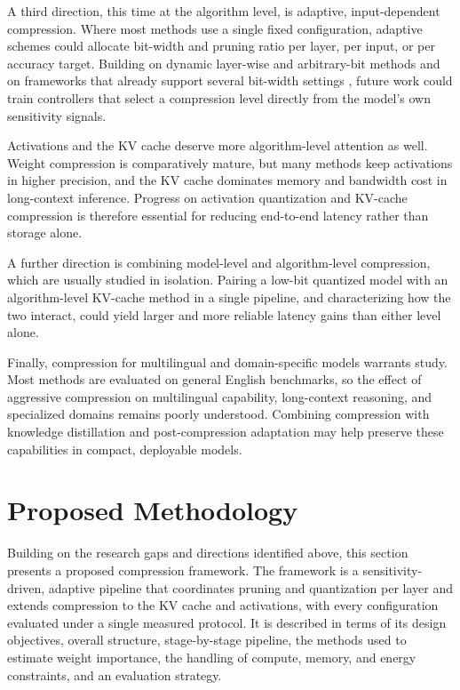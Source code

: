 \documentclass[
11pt, %
english, %
singlespacing, %
headsepline, %
]{MastersDoctoralThesis} %
\begin{document}
A third direction, this time at the algorithm level, is adaptive, input-dependent compression. Where most methods use a single fixed configuration, adaptive schemes could allocate bit-width and pruning ratio per layer, per input, or per accuracy target. Building on dynamic layer-wise and arbitrary-bit methods \cite{xu2026daypq,zeng2025abqllm} and on frameworks that already support several bit-width settings \cite{shao2024omniquant}, future work could train controllers that select a compression level directly from the model's own sensitivity signals.

Activations and the KV cache deserve more algorithm-level attention as well. Weight compression is comparatively mature, but many methods keep activations in higher precision, and the KV cache dominates memory and bandwidth cost in long-context inference. Progress on activation quantization \cite{xiao2023smoothquant,yuan2023rptq} and KV-cache compression \cite{zhang2023h2o,hooper2024kvquant,li2024snapkv} is therefore essential for reducing end-to-end latency rather than storage alone.

A further direction is combining model-level and algorithm-level compression, which are usually studied in isolation. Pairing a low-bit quantized model with an algorithm-level KV-cache method \cite{zhang2023h2o,hooper2024kvquant,ashkboos2024quarot} in a single pipeline, and characterizing how the two interact, could yield larger and more reliable latency gains than either level alone.

Finally, compression for multilingual and domain-specific models warrants study. Most methods are evaluated on general English benchmarks, so the effect of aggressive compression on multilingual capability, long-context reasoning, and specialized domains remains poorly understood. Combining compression with knowledge distillation and post-compression adaptation \cite{hsieh2023distilling,malinovskii2024pvtuning,muralidharan2024minitron} may help preserve these capabilities in compact, deployable models.

\section{Proposed Methodology}
\label{sec:lr-proposed}

Building on the research gaps and directions identified above, this section presents a proposed compression framework. The framework is a sensitivity-driven, adaptive pipeline that coordinates pruning and quantization per layer and extends compression to the KV cache and activations, with every configuration evaluated under a single measured protocol. It is described in terms of its design objectives, overall structure, stage-by-stage pipeline, the methods used to estimate weight importance, the handling of compute, memory, and energy constraints, and an evaluation strategy.
\end{document}
